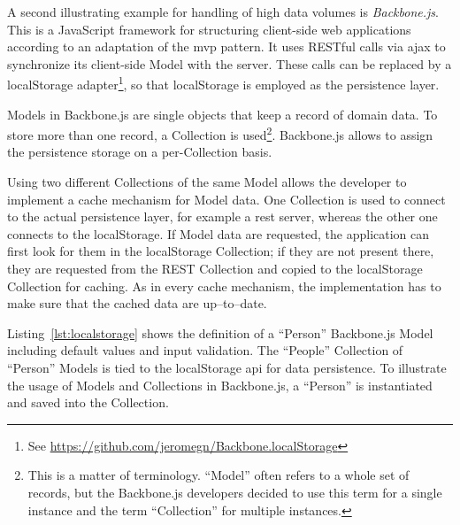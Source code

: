 A second illustrating example for handling of high data volumes is \emph{Backbone.js}. This is a JavaScript framework for structuring client-side web applications according to an adaptation of the \acl{mvp} pattern. It uses RESTful calls via \ac{ajax} to synchronize its client-side Model with the server. These calls can be replaced by a localStorage adapter\footnote{See \url{https://github.com/jeromegn/Backbone.localStorage}}, so that localStorage is employed as the persistence layer.

Models in Backbone.js are single objects that keep a record of domain data. To store more than one record, a Collection is used\footnote{This is a matter of terminology. ``Model'' often refers to a whole set of records, but the Backbone.js developers decided to use this term for a single instance and the term ``Collection'' for multiple instances.}.
Backbone.js allows to assign the persistence storage on a per-Collection basis.

Using two different Collections of the same Model allows the developer to implement a cache mechanism for Model data. One Collection is used to connect to the actual persistence layer, for example a \gls{rest} server, whereas the other one connects to the localStorage. If Model data are requested, the application can first look for them in the localStorage Collection; if they are not present there, they are requested from the REST Collection and copied to the localStorage Collection for caching. As in every cache mechanism, the implementation has to make sure that the cached data are up--to--date.

Listing~\ref{lst:localstorage} shows the definition of a ``Person'' Backbone.js Model including default values and input validation. The ``People'' Collection of ``Person'' Models is tied to the localStorage \ac{api} for data persistence.
To illustrate the usage of Models and Collections in Backbone.js, a ``Person'' is instantiated and saved into the Collection.


